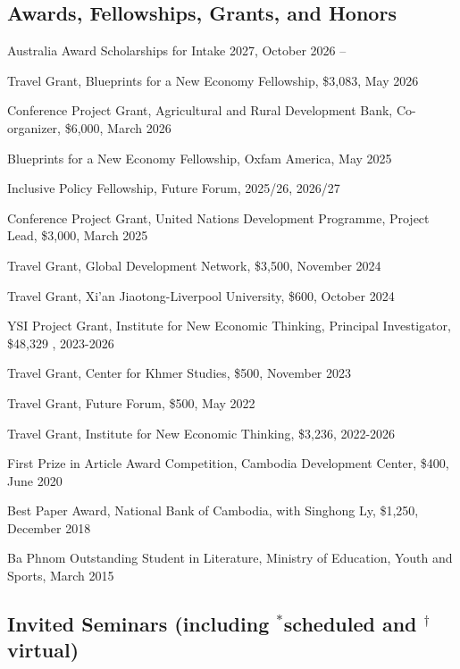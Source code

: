 \documentclass[10pt,a4paper]{article}
\begin{document}
\subsection*{Awards, Fellowships, Grants, and Honors}

\parindent=0pt

Australia Award Scholarships for Intake 2027, October 2026 -- %
		
Travel Grant, Blueprints for a New Economy Fellowship,  \$3,083, May 2026

Conference Project Grant, Agricultural and Rural Development Bank, Co-organizer, \$6,000, March 2026 

Blueprints for a New Economy Fellowship, Oxfam America, May 2025

Inclusive Policy Fellowship, Future Forum, 2025/26, 2026/27

Conference Project Grant, United Nations Development Programme, Project Lead, \$3,000, March 2025

Travel Grant, Global Development Network, \$3,500, November 2024

Travel Grant, Xi'an Jiaotong-Liverpool University, \$600, October 2024


YSI Project Grant, Institute for New Economic Thinking, Principal Investigator, \$48,329 , 2023-2026


Travel Grant, Center for Khmer Studies, \$500, November 2023

Travel Grant, Future Forum, \$500, May 2022

Travel Grant, Institute for New Economic Thinking, \$3,236, 2022-2026

First Prize in Article Award Competition, Cambodia Development Center, \$400, June 2020

Best Paper Award, National Bank of Cambodia, with Singhong Ly, \$1,250, December 2018 

Ba Phnom Outstanding Student in Literature, Ministry of Education, Youth and Sports, March 2015


\subsection*{Invited Seminars (including $^\ast$scheduled and $^\dag$virtual)}
\end{document}

